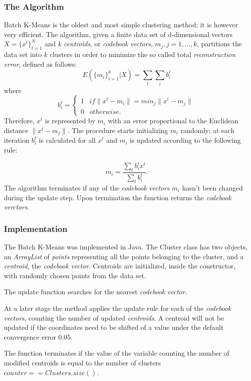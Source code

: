 \documentclass{lmproj}
\begin{document}
\subsubsection{The Algorithm}
Batch K-Means\cite{Clustering} is the oldest and most simple clustering method; it is however very efficient. The algorithm, given a finite data set of d-dimensional vectors $X=\{x^t\}_{t=1}^{N}$ and $k$ \textit{centroids}, or \textit{codebook vectors}, $m_j,j=1,...,k$, partitions the data set into $k$ clusters in order to minimize the so called total \textit{reconstruction error}, defined as follows:
\begin{equation}
E(\{m_i\}^k_{i=1}|X)=\underset{t}{\sum}\underset{i}{\sum}b_i^t
\end{equation}
where
\begin{equation}
b_i^t=
\begin{cases}
1 & if \parallel x^t -m_i \parallel = min_j \parallel x^t - m_j \parallel \\
0 & otherwise.
\end{cases}
\end{equation}
Therefore, $x^t$ is represented by $m_i$ with an error proportional to the Euclidean distance $\parallel x^t - m_j \parallel$. The procedure starts initializing $m_i$ randomly; at each iteration $b_i^t$ is calculated for all $x^t$ and $m_i$ is updated according to the following rule:

\begin{equation}
m_i=\dfrac{\sum_t b_i^t x^t}{\sum_t b_i^t}.
\end{equation}
The algorithm terminates if any of the \textit{codebook vectors} $m_i$ hasn't been changed during the update step. Upon termination the function returns the \textit{codebook verctors}.

\subsubsection{Implementation}
The Batch K-Means was implemented in Java. The Cluster class has two objects, an \textit{ArrayList} of \textit{points} representing all the points belonging to the cluster, and a \textit{centroid}, the \textit{codebook vector}.
Centroids are initialized, inside the constructor, with randomly chosen points from the data set.

The update function searches for the nearest \textit{codebook vector}.

At a later stage the method applies the update rule for each of the \textit{codebook vectors}, counting the number of updated \textit{centroids}. A centroid will not be updated if the coordinates need to be shifted of a value under the default convergence error $0.05$.

The function terminates if the value of the variable counting the number of modified centroids is equal to the number of clusters $counter == Clusters.size()$.
\end{document}

